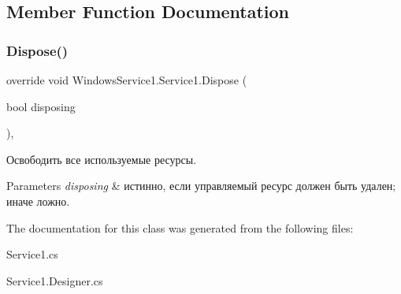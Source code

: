 \subsection{Member Function Documentation}
\hypertarget{class_windows_service1_1_1_service1_ae10ffc85ffbeade32c0c40756c334c73}{}\label{class_windows_service1_1_1_service1_ae10ffc85ffbeade32c0c40756c334c73} 
\subsubsection{\texorpdfstring{Dispose()}{Dispose()}}
{\footnotesize\ttfamily override void Windows\+Service1.\+Service1.\+Dispose (\begin{DoxyParamCaption}\item[{bool}]{disposing }\end{DoxyParamCaption})\hspace{0.3cm}{\ttfamily [inline]}, {\ttfamily [protected]}}



Освободить все используемые ресурсы. 


\begin{DoxyParams}{Parameters}
{\em disposing} & истинно, если управляемый ресурс должен быть удален; иначе ложно.\\
\hline
\end{DoxyParams}


The documentation for this class was generated from the following files\+:\begin{DoxyCompactItemize}
\item 
Service1.\+cs\item 
Service1.\+Designer.\+cs\end{DoxyCompactItemize}
